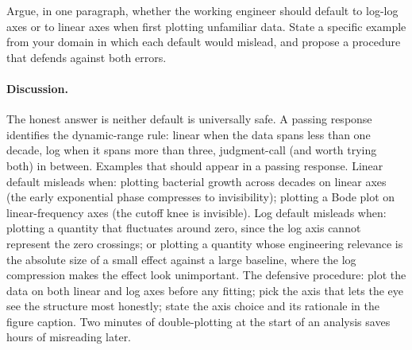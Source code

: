 \begin{exercise}
Argue, in one paragraph, whether the working engineer should default
to log-log axes or to linear axes when first plotting unfamiliar
data. State a specific example from your domain in which each
default would mislead, and propose a procedure that defends against
both errors.

\paragraph{Discussion.}
The honest answer is neither default is universally safe. A passing
response identifies the dynamic-range rule: linear when the data
spans less than one decade, log when it spans more than three,
judgment-call (and worth trying both) in between. Examples that
should appear in a passing response. Linear default misleads when:
plotting bacterial growth across decades on linear axes (the early
exponential phase compresses to invisibility); plotting a Bode plot
on linear-frequency axes (the cutoff knee is invisible). Log
default misleads when: plotting a quantity that fluctuates around
zero, since the log axis cannot represent the zero crossings; or
plotting a quantity whose engineering relevance is the absolute
size of a small effect against a large baseline, where the log
compression makes the effect look unimportant. The defensive
procedure: plot the data on both linear and log axes before any
fitting; pick the axis that lets the eye see the structure most
honestly; state the axis choice and its rationale in the figure
caption. Two minutes of double-plotting at the start of an
analysis saves hours of misreading later.
\end{exercise}

